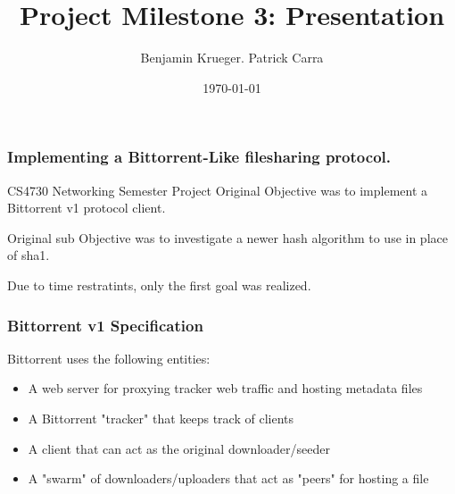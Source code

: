 \documentclass{beamer}
\title{Project Milestone 3: Presentation}
\author{Benjamin Krueger. Patrick Carra}
\date{\today}
\begin{document}
\begin{frame}
\frametitle{\maketitle}
\end{frame}

\begin{frame}
\frametitle{Implementing a Bittorrent-Like filesharing protocol.}
\begin{block}{CS4730 Networking Semester Project}
Original Objective was to implement a Bittorrent v1 protocol client.

Original sub Objective was to investigate a newer hash algorithm to use in place of sha1.

Due to time restratints, only the first goal was realized. 
\end{block}

\end{frame}

\begin{frame}
\frametitle{Bittorrent v1 Specification}
\begin{block}{Bittorrent uses the following entities:}
\begin{itemize}
\item A web server for proxying tracker web traffic and hosting metadata files
\item A Bittorrent "tracker" that keeps track of clients
\item A client that can act as the original downloader/seeder
\item A "swarm" of downloaders/uploaders that act as "peers" for hosting a file
\end{itemize}
\end{block}
\end{frame}
\end{document}
